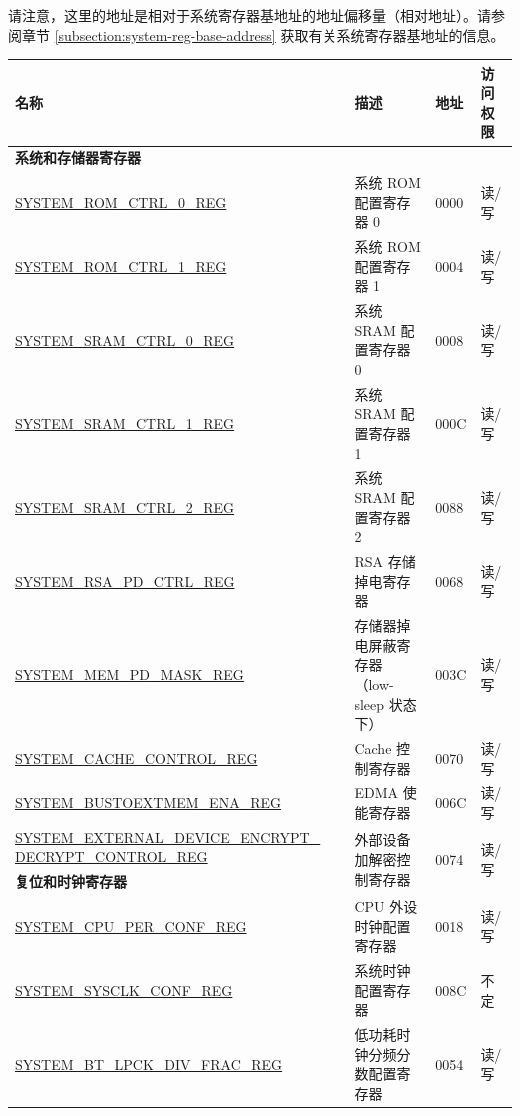 请注意，这里的地址是相对于系统寄存器基地址的地址偏移量（相对地址）。请参阅章节 \ref{subsection:system-reg-base-address} 获取有关系统寄存器基地址的信息。

\begin{longtable}{ | p{7cm} | p{6.5cm} | p{1.3cm} | p{1.5cm} | }
\hline\rowcolor{lightgray}
名称 & 描述 & 地址 & 访问权限 \\ \hline
\endhead
\multicolumn{4}{|l|}{\textbf{系统和存储器寄存器}} \\ \hline
\hyperref[regdesc:SYSTEMROMCTRL0REG]{SYSTEM\_ROM\_CTRL\_0\_REG} & 系统 ROM 配置寄存器 0 & \hexprefix{}0000 & 读/写 \\ \hline
\hyperref[regdesc:SYSTEMROMCTRL1REG]{SYSTEM\_ROM\_CTRL\_1\_REG} & 系统 ROM 配置寄存器 1 & \hexprefix{}0004 & 读/写 \\ \hline
\hyperref[regdesc:SYSTEMSRAMCTRL0REG]{SYSTEM\_SRAM\_CTRL\_0\_REG} & 系统 SRAM 配置寄存器 0 & \hexprefix{}0008 & 读/写 \\ \hline
\hyperref[regdesc:SYSTEMSRAMCTRL1REG]{SYSTEM\_SRAM\_CTRL\_1\_REG} & 系统 SRAM 配置寄存器 1 & \hexprefix{}000C & 读/写 \\ \hline
\hyperref[regdesc:SYSTEMSRAMCTRL2REG]{SYSTEM\_SRAM\_CTRL\_2\_REG} & 系统 SRAM 配置寄存器 2 & \hexprefix{}0088 & 读/写 \\ \hline
\hyperref[regdesc:SYSTEMRSAPDCTRLREG]{SYSTEM\_RSA\_PD\_CTRL\_REG} & RSA 存储掉电寄存器 & \hexprefix{}0068 & 读/写 \\ \hline
\hyperref[regdesc:SYSTEMMEMPDMASKREG]{SYSTEM\_MEM\_PD\_MASK\_REG} & 存储器掉电屏蔽寄存器（low-sleep 状态下） & \hexprefix{}003C & 读/写 \\ \hline
\hyperref[regdesc:SYSTEMCACHECONTROLREG]{SYSTEM\_CACHE\_CONTROL\_REG} & Cache 控制寄存器 & \hexprefix{}0070 & 读/写 \\ \hline
\hyperref[regdesc:SYSTEMBUSTOEXTMEMENAREG]{SYSTEM\_BUSTOEXTMEM\_ENA\_REG} & EDMA 使能寄存器 & \hexprefix{}006C & 读/写 \\ \hline
\hyperref[regdesc:SYSTEMEXTERNALDEVICEENCRYPTDECRYPTCONTROLREG]{SYSTEM\_EXTERNAL\_DEVICE\_ENCRYPT\_}  \hyperref[regdesc:SYSTEMEXTERNALDEVICEENCRYPTDECRYPTCONTROLREG]{DECRYPT\_CONTROL\_REG}  & \multirow{2}{*}{外部设备加解密控制寄存器} & \multirow{2}{*}{\hexprefix{}0074}  & \multirow{2}{*}{读/写} \\ \hline

\multicolumn{4}{|l|}{\textbf{复位和时钟寄存器}} \\ \hline

\hyperref[regdesc:SYSTEMCPUPERCONFREG]{SYSTEM\_CPU\_PER\_CONF\_REG} & CPU 外设时钟配置寄存器 & \hexprefix{}0018 & 读/写 \\ \hline
\hyperref[regdesc:SYSTEMSYSCLKCONFREG]{SYSTEM\_SYSCLK\_CONF\_REG} & 系统时钟配置寄存器 & \hexprefix{}008C & 不定 \\ \hline
\hyperref[regdesc:SYSTEMBTLPCKDIVFRACREG]{SYSTEM\_BT\_LPCK\_DIV\_FRAC\_REG} & 低功耗时钟分频分数配置寄存器 & \hexprefix{}0054 & 读/写 \\ \hline


\end{longtable}

